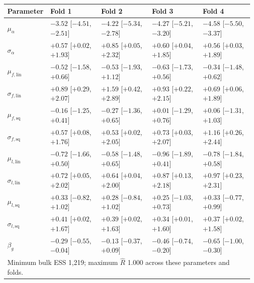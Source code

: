 \begin{tabular}{lllll}
\toprule
Parameter & Fold 1 & Fold 2 & Fold 3 & Fold 4 \\
\midrule
$\mu_\alpha$ & $-3.52$ [$-4.51$, $-2.51$] & $-4.22$ [$-5.34$, $-2.78$] & $-4.27$ [$-5.21$, $-3.20$] & $-4.58$ [$-5.50$, $-3.37$] \\
$\sigma_\alpha$ & $+0.57$ [$+0.02$, $+1.93$] & $+0.85$ [$+0.05$, $+2.32$] & $+0.60$ [$+0.04$, $+1.85$] & $+0.56$ [$+0.03$, $+1.89$] \\
$\mu_{f,\mathrm{lin}}$ & $-0.52$ [$-1.58$, $+0.66$] & $-0.53$ [$-1.93$, $+1.12$] & $-0.63$ [$-1.73$, $+0.56$] & $-0.34$ [$-1.48$, $+0.62$] \\
$\sigma_{f,\mathrm{lin}}$ & $+0.89$ [$+0.29$, $+2.07$] & $+1.59$ [$+0.42$, $+2.89$] & $+0.93$ [$+0.22$, $+2.15$] & $+0.69$ [$+0.06$, $+1.89$] \\
$\mu_{f,\mathrm{sq}}$ & $-0.16$ [$-1.25$, $+0.41$] & $-0.27$ [$-1.36$, $+0.65$] & $+0.01$ [$-1.29$, $+0.76$] & $+0.06$ [$-1.31$, $+1.03$] \\
$\sigma_{f,\mathrm{sq}}$ & $+0.57$ [$+0.08$, $+1.76$] & $+0.53$ [$+0.02$, $+2.05$] & $+0.73$ [$+0.03$, $+2.07$] & $+1.16$ [$+0.26$, $+2.44$] \\
$\mu_{l,\mathrm{lin}}$ & $-0.72$ [$-1.66$, $+0.50$] & $-0.58$ [$-1.48$, $+0.65$] & $-0.96$ [$-1.89$, $+0.41$] & $-0.78$ [$-1.84$, $+0.58$] \\
$\sigma_{l,\mathrm{lin}}$ & $+0.72$ [$+0.05$, $+2.02$] & $+0.64$ [$+0.04$, $+2.00$] & $+0.87$ [$+0.13$, $+2.18$] & $+0.97$ [$+0.23$, $+2.31$] \\
$\mu_{l,\mathrm{sq}}$ & $+0.33$ [$-0.82$, $+1.02$] & $+0.28$ [$-0.84$, $+1.02$] & $+0.25$ [$-1.03$, $+0.73$] & $+0.33$ [$-0.77$, $+0.99$] \\
$\sigma_{l,\mathrm{sq}}$ & $+0.41$ [$+0.02$, $+1.67$] & $+0.39$ [$+0.02$, $+1.63$] & $+0.34$ [$+0.01$, $+1.60$] & $+0.37$ [$+0.02$, $+1.58$] \\
$\beta_g$ & $-0.29$ [$-0.55$, $-0.04$] & $-0.13$ [$-0.37$, $+0.09$] & $-0.46$ [$-0.74$, $-0.20$] & $-0.65$ [$-1.00$, $-0.30$] \\
\midrule
\multicolumn{5}{l}{Minimum bulk ESS 1,219; maximum $\hat R$ 1.000 across these parameters and folds.} \\
\bottomrule
\end{tabular}
